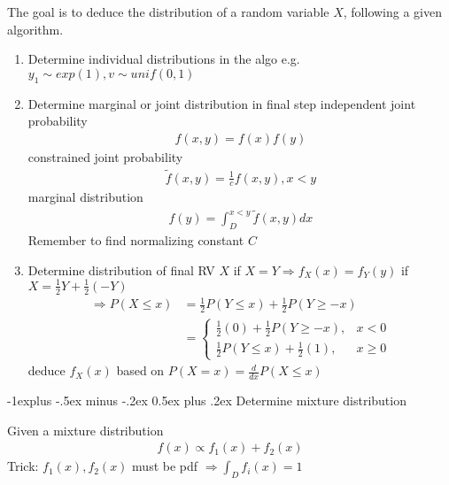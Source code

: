 \documentclass[a4paper,12pt,landscape]{article}
\makeatletter
\renewcommand{\subsection}{\@startsection{subsection}{2}{0mm}%
                                {-1explus -.5ex minus -.2ex}%
                                {0.5ex plus .2ex}%
                                {\normalfont\normalsize\bfseries\color{blue}}}
\makeatother
\begin{document}
\begin{multicols}{3}
The goal is to deduce the distribution of a random variable
$ X $, following a given algorithm.

\begin{enumerate}
    \item Determine individual distributions in the algo
        \subitem e.g. $ y_1 \sim
        exp(1), v \sim unif(0, 1)$
    \item Determine marginal or joint distribution in final
        step
        \subitem[a] independent joint probability
        \begin{align*}
            f(x, y)=f(x)f(y) 
        \end{align*}
        \subitem[b] constrained joint probability
        \begin{align*}
            \tilde{f}(x, y) = \frac{1}{c}f(x,y), x<y
        \end{align*}
        \subitem[c] marginal distribution
        \begin{align*}
            f(y) = \int_D^{x<y}\tilde{f}(x,y)dx
        \end{align*}
        \subitem Remember to find normalizing constant $ C $
    \item Determine distribution of final RV $ X $
        \subitem[a] if $ X = Y \Rightarrow f_X(x) =f_Y(y) $
        \subitem[b] if $ X = \frac{1}{2}Y + \frac{1}{2}(-Y) $
        \begin{align*}
            \Rightarrow P(X\leq x) &= \frac{1}{2}P(Y\leq x) +
            \frac{1}{2}P(Y \geq -x)\\
            &= \begin{cases} 
                \frac{1}{2}(0) + \frac{1}{2} P(Y \geq - x), & x < 0\\
                \frac{1}{2}P(Y\leq x) + \frac{1}{2}(1), &x\geq 0
            \end{cases}
        \end{align*}
        deduce $ f_X(x) $ based on $ P(X = x) =
        \frac{d}{dx} P(X \leq x) $
\end{enumerate}

\subsection{Determine mixture distribution}

Given a mixture distribution
\begin{align*}
    f(x) \propto f_1(x) + f_2(x)
\end{align*}
Trick: $ f_1(x), f_2(x) $ must be pdf $ \Rightarrow \int_D f_i(x) =1 $


\end{multicols}
\end{document}
